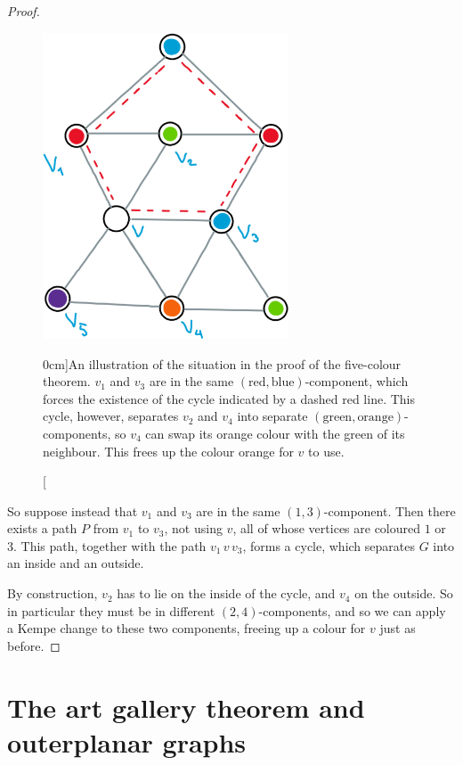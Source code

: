 \documentclass[nobib]{tufte-handout}
\begin{document}
\begin{theorem}
\begin{proof}
    \begin{figure}
      \centering
      \includegraphics[width=0.65\textwidth]{graphics/L12_colouring/planar_five_colour.png}
      \caption[][0cm]{An illustration of the situation in the proof of the five-colour theorem. $v_1$ and $v_3$ are in the same $(\text{red},\text{blue})$-component, which forces the existence of the cycle indicated by a dashed red line. This cycle, however, separates $v_2$ and $v_4$ into separate $(\text{green},\text{orange})$-components, so $v_4$ can swap its orange colour with the green of its neighbour. This frees up the colour orange for $v$ to use.}
      \label{fig:planar_five_colour}
    \end{figure}

    So suppose instead that $v_1$ and $v_3$ are in the same $(1,3)$-component. Then there exists a path $P$ from $v_1$ to $v_3$, not using $v$, all of whose vertices are coloured $1$ or $3$. This path, together with the path $v_1\, v\, v_3$, forms a cycle, which separates $G$ into an inside and an outside.

    By construction, $v_2$ has to lie on the inside of the cycle, and $v_4$ on the outside. So in particular they must be in different $(2,4)$-components, and so we can apply a Kempe change to these two components, freeing up a colour for $v$ just as before.
  \end{proof}
\end{theorem}

\section{The art gallery theorem and outerplanar graphs}
\end{document}
